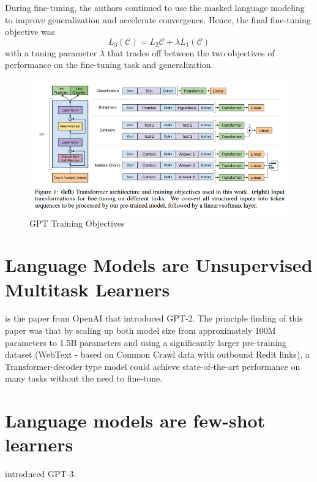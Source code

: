 \documentclass[11pt]{article}
\theoremstyle{definition}
\begin{document}
During fine-tuning, the authors continued to use the masked language modeling to improve generalization and accelerate convergence. Hence, the final fine-tuning objective was 
\begin{equation}
L_3(\mathcal{C}) = L_2{\mathcal{C}} + \lambda L_1(\mathcal{C})
\end{equation}
with a tuning parameter $\lambda$ that trades off between the two objectives of performance on the fine-tuning task and generalization.

\begin{figure}
\centering
  \includegraphics[width=\textwidth,height=\textheight,keepaspectratio]{transformers/gpt_objectives.png}
  \caption{GPT Training Objectives \cite{radford2018gpt}}
  \label{fig:gptobjectives}
\end{figure}

\section{Language Models are Unsupervised Multitask Learners \cite{radford2019gpt2}}

\cite{radford2019gpt2} is the paper from OpenAI that introduced GPT-2. The principle finding of this paper was that by scaling up both model size from approximately 100M parameters to 1.5B parameters and using a significantly larger pre-training dataset (WebText - based on Common Crawl data with outbound Redit links), a Transformer-decoder type model could achieve state-of-the-art performance on many tasks without the need to fine-tune.

\section{Language models are few-shot learners \cite{brown2020gpt3}}

\cite{brown2020gpt3} introduced GPT-3.
\end{document}

